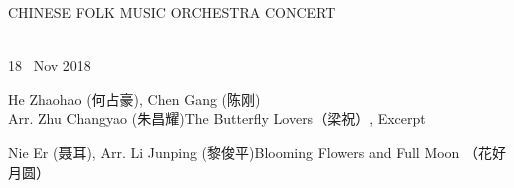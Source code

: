 \documentclass[letter,6pt,poets]{ConcProg}
\begin{document}

\begin{spacing}{0.85} 
\begin{center}
\Huge{C}\large{HINESE } \Huge{F}\large{OLK} \Huge{M}\large{USIC} \Huge{O}\large{RCHESTRA} \Huge{C}\LARGE{ONCERT}
\end{center}
\begin{programme}{
\\  {\normalsize 18 ~Nov 2018}
}
  \begin{part}[]
    \begin{composition}{He Zhaohao (何占豪), Chen Gang (陈刚) \\Arr. Zhu Changyao (朱昌耀)}{}{The Butterfly Lovers（梁祝）, Excerpt}{}
    \end{composition}
    
    \begin{composition}{Nie Er (聂耳), Arr. Li Junping (黎俊平)}{}{Blooming Flowers and Full Moon （花好月圆）}{}      
    \end{composition}
    

\end{part}
\end{programme}
\end{spacing}
\end{document}
